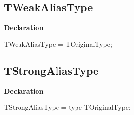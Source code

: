 \documentclass{report}
\newif\ifpdf
\begin{document}
\subsection*{TWeakAliasType}
\fi
\label{ok_type_aliases-TWeakAliasType}
\begin{list}{}{
\setlength{\itemindent}{0cm}
\setlength{\listparindent}{0cm}
\setlength{\leftmargin}{\evensidemargin}
\addtolength{\leftmargin}{\tmplength}
\settowidth{\labelsep}{X}
\addtolength{\leftmargin}{\labelsep}
\setlength{\labelwidth}{\tmplength}
}
\item[\textbf{Declaration}\hfill]
\ifpdf
\begin{flushleft}
\fi
\begin{ttfamily}
TWeakAliasType = TOriginalType;\end{ttfamily}

\ifpdf
\end{flushleft}
\fi

\end{list}
\ifpdf
\subsection*{\large{\textbf{TStrongAliasType}}\normalsize\hspace{1ex}\hrulefill}
\else
\subsection*{TStrongAliasType}
\fi
\label{ok_type_aliases-TStrongAliasType}
\begin{list}{}{
\setlength{\itemindent}{0cm}
\setlength{\listparindent}{0cm}
\setlength{\leftmargin}{\evensidemargin}
\addtolength{\leftmargin}{\tmplength}
\settowidth{\labelsep}{X}
\addtolength{\leftmargin}{\labelsep}
\setlength{\labelwidth}{\tmplength}
}
\item[\textbf{Declaration}\hfill]
\ifpdf
\begin{flushleft}
\fi
\begin{ttfamily}
TStrongAliasType = type TOriginalType;\end{ttfamily}

\ifpdf
\end{flushleft}
\fi

\end{list}
\end{document}
